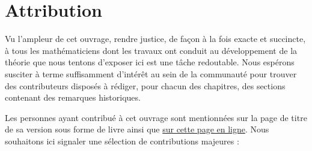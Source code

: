 \section{Attribution}
\label{section-attribution}

\noindent
Vu l'ampleur de cet ouvrage, rendre justice, de façon à la fois exacte et
succincte, à tous les mathématiciens dont
les travaux ont conduit au d\'eveloppement de la th\'eorie que nous tentons
d'exposer ici est une tâche redoutable. Nous esp\'erons susciter \`a terme suffisamment d'int\'er\^et au
sein de la communaut\'e pour trouver des contributeurs dispos\'es \`a r\'ediger,
pour chacun des chapitres, des sections contenant des remarques historiques.

\medskip\noindent
Les personnes ayant contribu\'e \`a cet ouvrage sont mentionn\'ees sur la page
de titre de sa version sous forme de livre ainsi que
\href{https://stacks.math.columbia.edu/tex/CONTRIBUTORS}{sur cette page en ligne}.
Nous souhaitons ici signaler une s\'election de contributions majeures :

